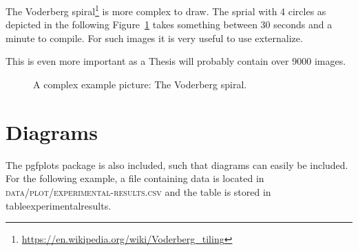 The Voderberg spiral\footnote{\url{https://en.wikipedia.org/wiki/Voderberg_tiling}} is more complex to draw. The sprial with 4 circles
as depicted in the following Figure~\ref{fig:chapter-3-voderberg} takes something between 30 seconds and a minute to compile. For such
images it is very useful to use externalize.

This is even more important as a Thesis will probably contain over 9000 images.

\begin{figure}
  \centering
    

  \caption[The Voderberg spiral.]{A complex example picture: The Voderberg spiral.}
  \label{fig:chapter-3-voderberg}
\end{figure}

\section{Diagrams}

The pgfplots package is also included, such that diagrams can easily be included. For the following example, a file containing data is located in \textsc{data/plot/experimental-results.csv} and the table is stored in \\tableexperimentalresults.

